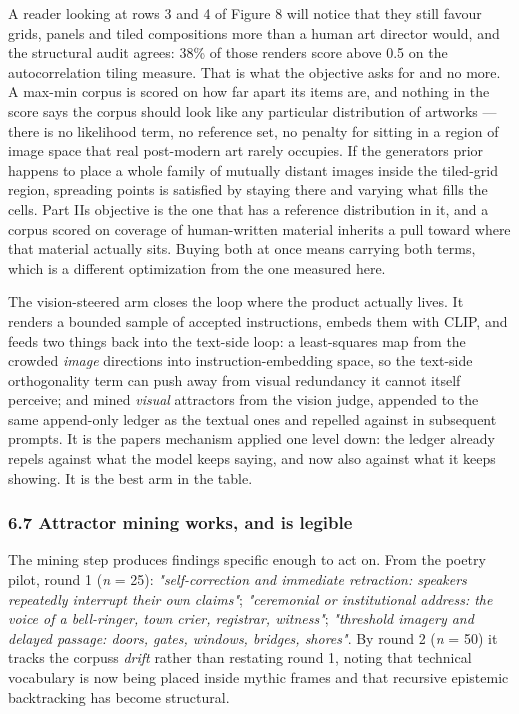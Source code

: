 \documentclass[
  11pt,
]{article}
\theoremstyle{plain}
\theoremstyle{definition}
\begin{document}
A reader looking at rows 3 and 4 of Figure 8 will notice that they still
favour grids, panels and tiled compositions more than a human art
director would, and the structural audit agrees: 38\% of those renders
score above 0.5 on the autocorrelation tiling measure. That is what the
objective asks for and no more. A max-min corpus is scored on how far
apart its items are, and nothing in the score says the corpus should
look like any particular distribution of artworks --- there is no
likelihood term, no reference set, no penalty for sitting in a region of
image space that real post-modern art rarely occupies. If the
generator\textquotesingle s prior happens to place a whole family of
mutually distant images inside the tiled-grid region, spreading points
is satisfied by staying there and varying what fills the cells. Part
II\textquotesingle s objective is the one that has a reference
distribution in it, and a corpus scored on coverage of human-written
material inherits a pull toward where that material actually sits.
Buying both at once means carrying both terms, which is a different
optimization from the one measured here.

The vision-steered arm closes the loop where the product actually lives.
It renders a bounded sample of accepted instructions, embeds them with
CLIP, and feeds two things back into the text-side loop: a least-squares
map from the crowded \emph{image} directions into instruction-embedding
space, so the text-side orthogonality term can push away from visual
redundancy it cannot itself perceive; and mined \emph{visual} attractors
from the vision judge, appended to the same append-only ledger as the
textual ones and repelled against in subsequent prompts. It is the
paper\textquotesingle s mechanism applied one level down: the ledger
already repels against what the model keeps saying, and now also against
what it keeps showing. It is the best arm in the table.

\subsubsection{6.7 Attractor mining works, and is
legible}\label{67-attractor-mining-works-and-is-legible}

The mining step produces findings specific enough to act on. From the
poetry pilot, round 1 (\emph{n} = 25): \emph{"self-correction and
immediate retraction: speakers repeatedly interrupt their own claims"};
\emph{"ceremonial or institutional address: the voice of a bell-ringer,
town crier, registrar, witness"}; \emph{"threshold imagery and delayed
passage: doors, gates, windows, bridges, shores"}. By round 2 (\emph{n}
= 50) it tracks the corpus\textquotesingle s \emph{drift} rather than
restating round 1, noting that technical vocabulary is now being placed
inside mythic frames and that recursive epistemic backtracking has
become structural.
\end{document}

